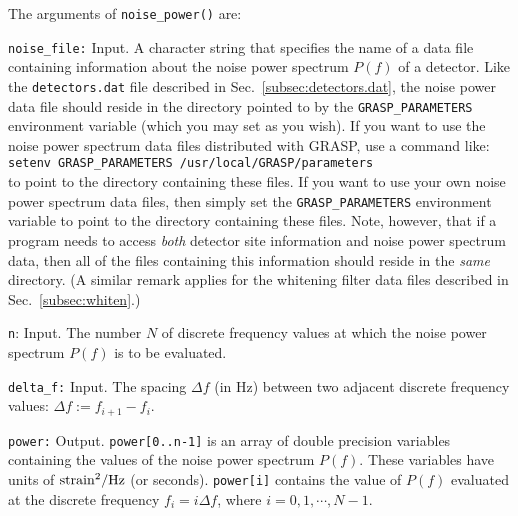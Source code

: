 The arguments of {\tt noise\_power()} are:
\begin{description}
%
\item{\tt noise\_file:} Input. 
A character string that specifies
the name of a data file containing information about the noise 
power spectrum $P(f)$ of a detector.
Like the {\tt detectors.dat} file described in 
Sec.~\ref{subsec:detectors.dat}, the noise power data file should
reside in the directory pointed to by the {\tt GRASP\_PARAMETERS} 
environment variable (which you may set as you wish).
If you want to use the noise power spectrum data files distributed 
with GRASP, use a command like:\\
{\tt setenv GRASP\_PARAMETERS /usr/local/GRASP/parameters}\\
to point to the directory containing these files.  
If you want to use your own noise power spectrum data files, then
simply set the {\tt GRASP\_PARAMETERS} environment variable to point 
to the directory containing these files.
Note, however, that if a program needs to access {\it both}
detector site information and noise power spectrum data, then all of 
the files containing this information should reside in the {\it same} 
directory.
(A similar remark applies for the whitening filter data files
described in Sec.~\ref{subsec:whiten}.) 
%
\item{\tt n}: Input.
The number $N$ of discrete frequency values at which the noise power
spectrum $P(f)$ is to be evaluated.
%
\item{\tt delta\_f:} Input.
The spacing $\Delta f$ (in Hz) between two adjacent discrete frequency
values: $\Delta f:=f_{i+1}-f_i$.  
%
\item{\tt power:} Output.
{\tt power[0..n-1]} is an array of double precision variables containing 
the values of the noise power spectrum $P(f)$.
These variables have units of ${\rm strain}^2/{\rm Hz}$ (or seconds).
{\tt power[i]} contains the value of $P(f)$ evaluated at the discrete
frequency $f_i=i\Delta f$, where $i=0,1,\cdots,N-1$.
\end{description}

